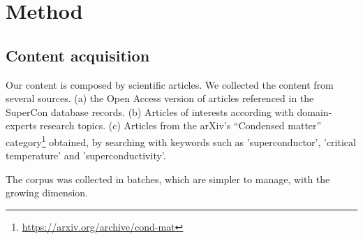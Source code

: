 \documentclass[a4paper,10pt]{article}
\begin{document}






\label{sec:method}
\section{Method}
\subsection{Content acquisition}
Our content is composed by scientific articles. We collected the content from several sources. (a) the Open Access version of articles referenced in the SuperCon database records. (b) Articles of interests according with domain-experts research topics. (c) Articles from the arXiv's “Condensed matter” category\footnote{\url{https://arxiv.org/archive/cond-mat}} obtained, by searching with keywords such as 'superconductor', 'critical temperature' and 'superconductivity'.

The corpus was collected in batches, which are simpler to manage, with the growing dimension. 
\end{document}
